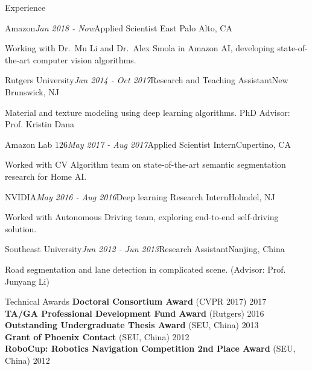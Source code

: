 \documentclass{resume} %
\begin{document}
\begin{rSection}{Experience}

\begin{rSubsection}{Amazon}{\em Jan 2018 - Now}{Applied Scientist  }{East Palo Alto, CA}
\item Working with Dr.~Mu Li and Dr.~Alex Smola in Amazon AI, developing state-of-the-art computer vision algorithms.
\end{rSubsection}

\begin{rSubsection}{Rutgers University}{\em Jan 2014 - Oct 2017}{Research and Teaching Assistant}{New Brunswick, NJ}
\item Material and texture modeling using deep learning algorithms. PhD Advisor: Prof. Kristin Dana
\end{rSubsection}

\begin{rSubsection}{Amazon Lab 126}{\em May 2017 - Aug 2017}{Applied Scientist Intern}{Cupertino, CA}
\item Worked with CV Algorithm team on state-of-the-art semantic segmentation research for Home AI. 
\end{rSubsection}

\begin{rSubsection}{NVIDIA}{\em May 2016 - Aug 2016}{Deep learning Research Intern}{Holmdel, NJ}
\item Worked with Autonomous Driving team, exploring end-to-end self-driving solution. 
\end{rSubsection}

\begin{rSubsection}{Southeast University}{\em Jun 2012 - Jun 2013}{Research Assistant}{Nanjing, China}
\item 
Road segmentation and lane detection in complicated scene. (Advisor: Prof. Junyang Li)
\end{rSubsection}

\end{rSection}


\begin{rSection}{Technical Awards}
{\bf Doctoral Consortium Award} (CVPR 2017) \hfill {2017} \\
{\bf TA/GA Professional Development Fund Award} (Rutgers) \hfill {2016}\\ 
{\bf Outstanding Undergraduate Thesis Award} (SEU, China) \hfill {2013}\\
{\bf Grant of Phoenix Contact} (SEU, China) \hfill {2012} \\
{\bf RoboCup: Robotics Navigation Competition 2nd Place Award} (SEU, China) \hfill {2012}

\end{rSection}
\end{document}
